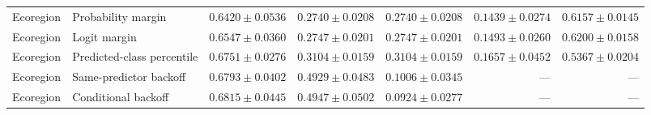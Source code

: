 \begin{table}[htbp]
\begin{tabular}{llrrrrr}
Ecoregion & Probability margin & $0.6420\pm0.0536$ & $0.2740\pm0.0208$ & $0.2740\pm0.0208$ & $0.1439\pm0.0274$ & $0.6157\pm0.0145$ \\
Ecoregion & Logit margin & $0.6547\pm0.0360$ & $0.2747\pm0.0201$ & $0.2747\pm0.0201$ & $0.1493\pm0.0260$ & $0.6200\pm0.0158$ \\
Ecoregion & Predicted-class percentile & $0.6751\pm0.0276$ & $0.3104\pm0.0159$ & $0.3104\pm0.0159$ & $0.1657\pm0.0452$ & $0.5367\pm0.0204$ \\
Ecoregion & Same-predictor backoff & $0.6793\pm0.0402$ & $0.4929\pm0.0483$ & $0.1006\pm0.0345$ & --- & --- \\
Ecoregion & Conditional backoff & $0.6815\pm0.0445$ & $0.4947\pm0.0502$ & $0.0924\pm0.0277$ & --- & --- \\
\bottomrule
\end{tabular}
\end{table}
